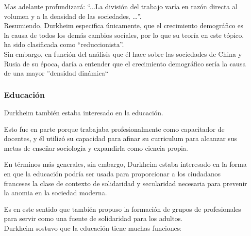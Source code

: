 Mas adelante profundizará: ``...La división del trabajo varía en razón directa al volumen y a la densidad de las sociedades, …''.\\
Resumiendo, Durkheim especifica únicamente, que el crecimiento demográfico es la causa de todos los demás cambios sociales, por lo que su teoría en este tópico, ha sido clasificada como ``reduccionista''.\\
Sin embargo, en función del análisis que él hace sobre las sociedades de China y Rusia de su época, daría a entender que el crecimiento demográfico sería la causa de una mayor ''densidad dinámica``\\

\subsubsection{Educaci\'on}
Durkheim tambi\'en estaba interesado en la educaci\'on.

 Esto fue en parte porque trabajaba profesionalmente como capacitador de docentes, y \'el utiliz\'o su capacidad para afinar su curriculum para alcanzar sus metas de ense\~nar sociolog\'ia y expandirla como ciencia propia.

En t\'erminos m\'as generales, sin embargo, Durkheim estaba interesado en la forma en que la educaci\'on podr\'ia ser usada para proporcionar a los ciudadanos franceses la clase de contexto de solidaridad y secularidad necesaria para prevenir la anomia en la sociedad moderna.

Es en este sentido que tambi\'en propuso la formaci\'on de grupos de profesionales para servir como una fuente de solidaridad para los adultos. \\

Durkheim sostuvo que la educaci\'on tiene muchas funciones:

